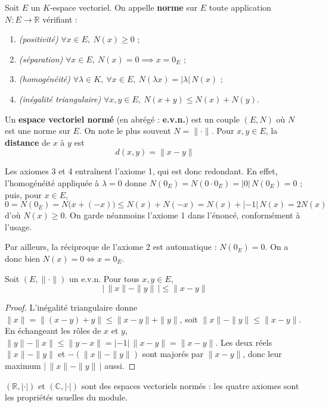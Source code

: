 \begin{defi}[Norme]
\label{defi:norme}
Soit $E$ un $K$-espace vectoriel. On appelle \textbf{norme} sur $E$ toute application $N : E\to\mathbb{R}$ vérifiant :
\begin{enumerate}
\item \emph{(positivité)} $\forall x\in E,\ N(x)\geq 0$ ;
\item \emph{(séparation)} $\forall x\in E,\ N(x)=0 \implies x=0_E$ ;
\item \emph{(homogénéité)} $\forall\lambda\in K,\ \forall x\in E,\ N(\lambda x)=|\lambda|\,N(x)$ ;
\item \emph{(inégalité triangulaire)} $\forall x,y\in E,\ N(x+y)\leq N(x)+N(y)$.
\end{enumerate}
Un \textbf{espace vectoriel normé} (en abrégé : \textbf{e.v.n.}) est un couple $(E,N)$ où $N$ est une norme sur $E$. On note le plus souvent $N=\|\cdot\|$. Pour $x,y\in E$, la \textbf{distance} de $x$ à $y$ est
\[d(x,y) = \|x-y\|\]
\end{defi}

\begin{remarque}
Les axiomes 3 et 4 entraînent l'axiome 1, qui est donc redondant. En effet, l'homogénéité appliquée à $\lambda=0$ donne $N(0_E)=N(0\cdot 0_E)=|0|\,N(0_E)=0$ ; puis, pour $x\in E$,
\[0 = N(0_E) = N\big(x+(-x)\big) \leq N(x)+N(-x) = N(x)+|-1|\,N(x) = 2N(x)\]
d'où $N(x)\geq 0$. On garde néanmoins l'axiome 1 dans l'énoncé, conformément à l'usage.

Par ailleurs, la réciproque de l'axiome 2 est automatique : $N(0_E)=0$. On a donc bien $N(x)=0\iff x=0_E$.
\end{remarque}

\begin{prop}
\label{prop:inegalite-triangulaire-inverse}
Soit $(E,\|\cdot\|)$ un e.v.n. Pour tous $x,y\in E$,
\[\big|\,\|x\|-\|y\|\,\big| \leq \|x-y\|\]
\end{prop}

\begin{proof}
L'inégalité triangulaire donne $\|x\|=\|(x-y)+y\|\leq\|x-y\|+\|y\|$, soit $\|x\|-\|y\|\leq\|x-y\|$. En échangeant les rôles de $x$ et $y$, $\|y\|-\|x\|\leq\|y-x\|=|-1|\,\|x-y\|=\|x-y\|$. Les deux réels $\|x\|-\|y\|$ et $-(\|x\|-\|y\|)$ sont majorés par $\|x-y\|$, donc leur maximum $\big|\,\|x\|-\|y\|\,\big|$ aussi.
\end{proof}

\begin{exemple}
$(\mathbb{R},|\cdot|)$ et $(\mathbb{C},|\cdot|)$ sont des espaces vectoriels normés : les quatre axiomes sont les propriétés usuelles du module.
\end{exemple}

